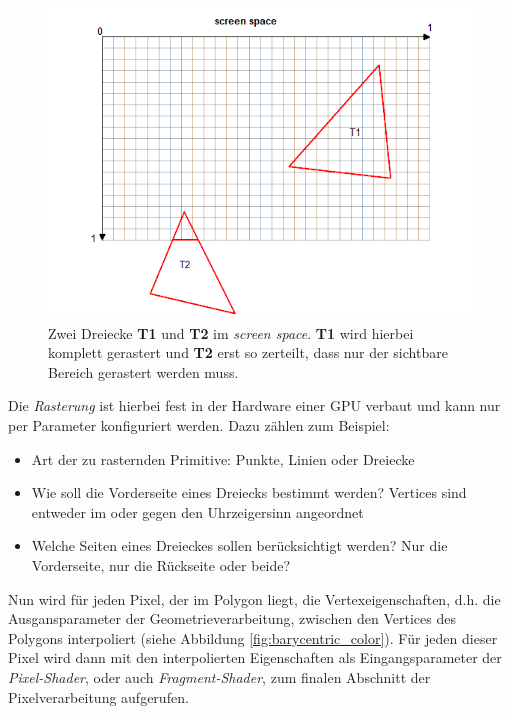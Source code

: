 \documentclass[oneside]{ausarbeitung}
\begin{document}
\begin{figure}
    \includegraphics[width=\textwidth]{images/screen_space_rasterizing.png}
    \caption{Zwei Dreiecke \textbf{T1} und \textbf{T2} im \textit{screen space}. \textbf{T1} wird hierbei komplett gerastert und \textbf{T2} erst so zerteilt, dass nur der sichtbare Bereich gerastert werden muss.}
    \label{fig:screen_space}
\end{figure}

Die \textit{Rasterung} ist hierbei fest in der Hardware einer \ac{GPU} verbaut und kann nur per Parameter konfiguriert werden. Dazu zählen zum Beispiel:

\begin{itemize}
\item{Art der zu rasternden Primitive: Punkte, Linien oder Dreiecke}
\item{Wie soll die Vorderseite eines Dreiecks bestimmt werden? Vertices sind entweder im oder gegen den Uhrzeigersinn angeordnet}
\item{Welche Seiten eines Dreieckes sollen berücksichtigt werden? Nur die Vorderseite, nur die Rückseite oder beide?}
\end{itemize}

Nun wird für jeden Pixel, der im Polygon liegt, die Vertexeigenschaften, d.h. die Ausgansparameter der Geometrieverarbeitung, zwischen den Vertices des Polygons interpoliert (siehe Abbildung \ref{fig:barycentric_color}). Für jeden dieser Pixel wird dann mit den interpolierten Eigenschaften als Eingangsparameter der \textit{Pixel-Shader}, oder auch \textit{Fragment-Shader}, zum finalen Abschnitt der Pixelverarbeitung aufgerufen. 
\end{document}

